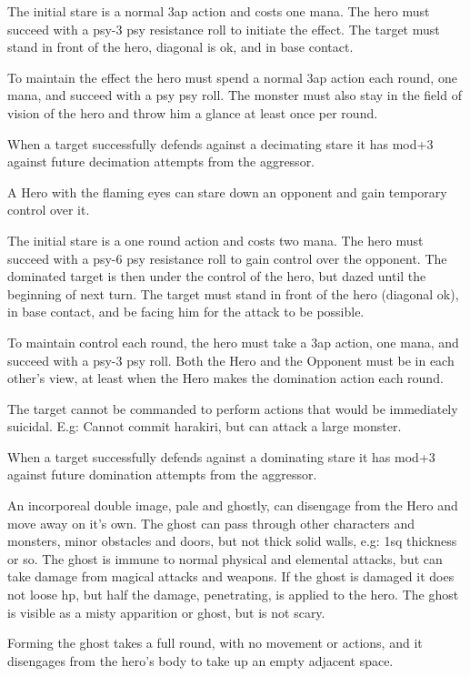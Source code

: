 The initial stare is a normal 3ap action and costs one mana. The hero must succeed with a psy-3 \vs psy resistance roll to initiate the effect. The target must stand in front of the hero, diagonal is ok, and in base contact.

To maintain the effect the hero must spend a normal 3ap action each round, one mana, and succeed with a psy \vs psy roll. The monster must also stay in the field of vision of the hero and throw him a glance at least once per round.

When a target successfully defends against a decimating stare it has mod+3 against future decimation attempts from the aggressor.


 A Hero with the flaming eyes can stare down an opponent and gain temporary control over it.

The initial stare is a one round action and costs two mana. The hero must succeed with a psy-6 \vs psy resistance roll to gain control over the opponent. The dominated target is then under the control of the hero, but dazed until the beginning of next turn. The target must stand in front of the hero (diagonal ok), in base contact, and be facing him for the attack to be possible.

To maintain control each round, the hero must take a 3ap action, one mana, and succeed with a psy-3 \vs psy roll. Both the Hero and the Opponent must be in each other's view, at least when the Hero makes the domination action each round.

The target cannot be commanded to perform actions that would be immediately suicidal. E.g: Cannot commit harakiri, but can attack a large monster.

When a target successfully defends against a dominating stare it has mod+3 against future domination attempts from the aggressor.


 An incorporeal double image, pale and ghostly, can disengage from the Hero and move away on it's own. The ghost can pass through other characters and monsters, minor obstacles and doors, but not thick solid walls, e.g: 1sq thickness or so. The ghost is immune to normal physical and elemental attacks, but can take damage from magical attacks and weapons. If the ghost is damaged it does not loose hp, but half the damage, penetrating, is applied to the hero. The ghost is visible as a misty apparition or ghost, but is not scary.

Forming the ghost takes a full round, with no movement or actions, and it disengages from the hero's body to take up an empty adjacent space.

